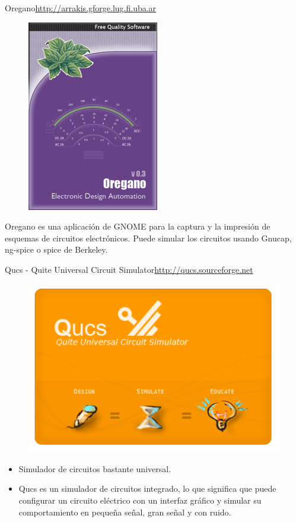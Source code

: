 \documentclass{beamer}
\begin{document}
\begin{frame}{Oregano}{\url{http://arrakis.gforge.lug.fi.uba.ar}}
  \begin{figure}[!h]
    \centering
    \includegraphics[scale=0.3]{img/oregano.png}
  \end{figure}
  Oregano es una aplicación de GNOME para la captura y la impresión de esquemas de circuitos electrónicos. Puede simular los circuitos usando Gnucap, ng-spice o spice de Berkeley.
\end{frame}

\begin{frame}{Qucs - Quite Universal Circuit Simulator}{\url{http://qucs.sourceforge.net}}
  \begin{figure}[!h]
    \centering
    \includegraphics[scale=0.3]{img/qucslogo4.png}
  \end{figure}
  \begin{itemize}
  \item Simulador de circuitos bastante universal.
  \item Qucs es un simulador de circuitos integrado, lo que significa que puede configurar un circuito eléctrico con un interfaz gráfico y simular su comportamiento en pequeña señal, gran señal y con ruido.
  \end{itemize}
\end{frame}
\end{document}
